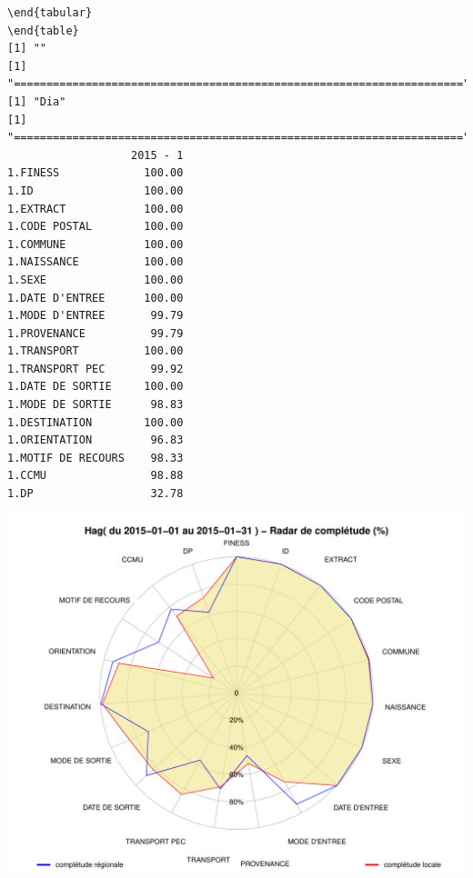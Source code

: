 \documentclass[]{article}
\begin{document}
\begin{verbatim}
\end{tabular} 
\end{table} 
[1] ""
[1] "====================================================================="
[1] "Dia"
[1] "====================================================================="
                   2015 - 1
1.FINESS             100.00
1.ID                 100.00
1.EXTRACT            100.00
1.CODE POSTAL        100.00
1.COMMUNE            100.00
1.NAISSANCE          100.00
1.SEXE               100.00
1.DATE D'ENTREE      100.00
1.MODE D'ENTREE       99.79
1.PROVENANCE          99.79
1.TRANSPORT          100.00
1.TRANSPORT PEC       99.92
1.DATE DE SORTIE     100.00
1.MODE DE SORTIE      98.83
1.DESTINATION        100.00
1.ORIENTATION         96.83
1.MOTIF DE RECOURS    98.33
1.CCMU                98.88
1.DP                  32.78
\end{verbatim}

\includegraphics{completude_files/figure-latex/finess-6.pdf}
\end{document}

